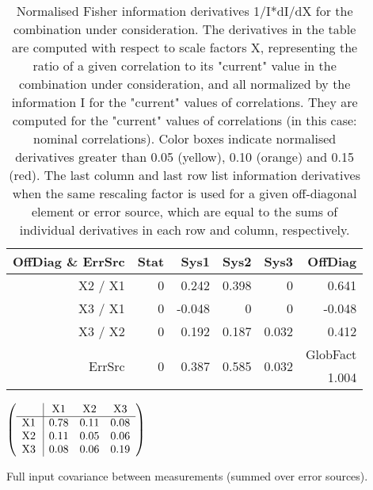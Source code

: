 \begin{table}[H]
\scriptsize
\begin{center}
\renewcommand{\arraystretch}{1.1}
\begin{tabular}{|r|rrrr|r|}
\hline
 OffDiag \& ErrSrc & {\tiny Stat} & {\tiny Sys1} & {\tiny Sys2} & {\tiny Sys3} & OffDiag\\
\hline
X2 / X1 &  0 &  \colorbox{Tomato1}{    0.242} &  \colorbox{Tomato1}{    0.398} &  0 &  \colorbox{Tomato1}{    0.641} \\
X3 / X1 &  0 &     -0.048 &  0 &  0 &     -0.048 \\
X3 / X2 &  0 &  \colorbox{Tomato1}{    0.192} &  \colorbox{Tomato1}{    0.187} &      0.032 &  \colorbox{Tomato1}{    0.412} \\
\hline
\multirow{2}{*}{ErrSrc} & \multirow{2}{*}{ 0} & \multirow{2}{*}{ \colorbox{Tomato1}{    0.387}} & \multirow{2}{*}{ \colorbox{Tomato1}{    0.585}} & \multirow{2}{*}{     0.032} & GlobFact\\
 & & & & &  \colorbox{Tomato1}{    1.004} \\
\hline
\end{tabular}
\renewcommand{\arraystretch}{1}
\caption{Normalised Fisher information derivatives 1/I*dI/dX for the combination under consideration. The derivatives in the table are computed with respect to scale factors X, representing the ratio of a given correlation to its "current" value in the combination under consideration, and all normalized by the information I for the "current" values of correlations. They are computed for the "current" values of correlations (in this case: nominal correlations). Color boxes indicate normalised derivatives greater than 0.05 (yellow), 0.10 (orange) and 0.15 (red). The last column and last row list information derivatives when the same rescaling factor is used for a given off-diagonal element or error source, which are equal to the sums of individual derivatives in each row and column, respectively.}
\end{center}
\end{table}
\begin{table}[H]
\scriptsize
\begin{center}
\renewcommand{\arraystretch}{1.1}
\begin{math}\left(\begin{array}{c|ccc}
 & \mathrm{X1} & 
\mathrm{X2} & 
\mathrm{X3} \\
\hline
\mathrm{X1} \hspace*{2pt} &       0.78 &       0.11 &       0.08 \\
\mathrm{X2} \hspace*{2pt} &       0.11 &       0.05 &       0.06 \\
\mathrm{X3} \hspace*{2pt} &       0.08 &       0.06 &       0.19 \\
\end{array}\right)\end{math}
\caption{Full input covariance between measurements (summed over error sources).}
\renewcommand{\arraystretch}{1}
\end{center}
\end{table}
